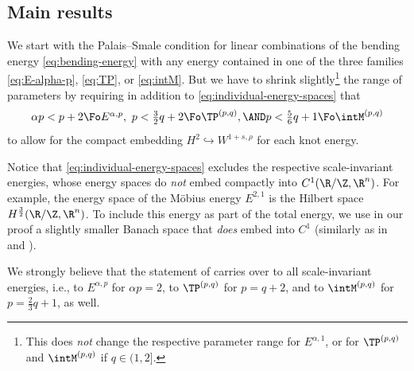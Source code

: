 \subsection{Main results}
We start with the Palais--Smale condition for linear combinations of the
bending energy \cref{eq:bending-energy} with any energy contained in
one of the
three families \cref{eq:E-alpha-p}, \cref{eq:TP}, or \cref{eq:intM}. But we
have to shrink slightly\footnote{This does \emph{not} change the 
respective parameter range
for $E^{\alpha,1}$, or for $\TP^{(p,q)}$ and $\intM^{(p,q)}$ if $q\in (1,2]$.}
the range of parameters by requiring in addition to
\cref{eq:individual-energy-spaces} that
\begin{equation}\label{eq:shrink-range}
\textstyle
\alpha p<p+2\Fo E^{\alpha,p},\,\, p<\frac{3}{2} q +2\Fo
\TP^{(p,q)},\AND p<\frac{5}{6} q+1\Fo \intM^{(p,q)}
\end{equation}
to allow for the compact embedding $H^2\hookrightarrow W^{1+s,\rho}$ for 
each knot energy. 
Notice that \cref{eq:individual-energy-spaces} excludes the respective
scale-invariant energies, whose energy spaces do \emph{not} embed compactly
into $C^1(\R/\Z,\R^n)$. For example, the energy space of the
M\"obius energy $E^{2,1}$ is the Hilbert space
$H^{\frac{3}{2}}(\R/\Z,\R^n)$. To include this energy as part of
the total energy, we
use in our proof
a slightly smaller Banach space that \emph{does} embed
into $C^1$ (similarly as in 
\cite{reiter-schumacher_2021} and \cite{matt-etal_2023}).
We strongly believe that the statement of 
carries over to all scale-invariant energies, i.e., to $E^{\alpha,p}$
for $\alpha p=2$, to $\TP^{(p,q)}$ for $p=q+2$, and to $\intM^{(p,q)}$
for $p=\frac23 q +1$, as well.

